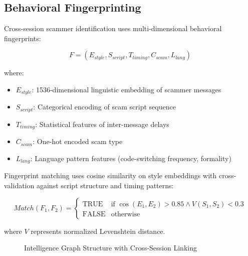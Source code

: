 \documentclass[conference]{IEEEtran}
\begin{document}
\subsection{Behavioral Fingerprinting}

Cross-session scammer identification uses multi-dimensional behavioral fingerprints:

\begin{equation}
F = (E_{style}, S_{script}, T_{timing}, C_{scam}, L_{lang})
\end{equation}

where:
\begin{itemize}
    \item $E_{style}$: 1536-dimensional linguistic embedding of scammer messages
    \item $S_{script}$: Categorical encoding of scam script sequence
    \item $T_{timing}$: Statistical features of inter-message delays
    \item $C_{scam}$: One-hot encoded scam type
    \item $L_{lang}$: Language pattern features (code-switching frequency, formality)
\end{itemize}

Fingerprint matching uses cosine similarity on style embeddings with cross-validation against script structure and timing patterns:

\begin{equation}
Match(F_1, F_2) = \begin{cases}
    \text{TRUE} & \text{if } \cos(E_1, E_2) > 0.85 \land V(S_1, S_2) < 0.3 \\
    \text{FALSE} & \text{otherwise}
\end{cases}
\end{equation}

where $V$ represents normalized Levenshtein distance.

\begin{figure}[htbp]
\centerline{}
\caption{Intelligence Graph Structure with Cross-Session Linking}
\label{fig:graph}
\end{figure}
\end{document}
